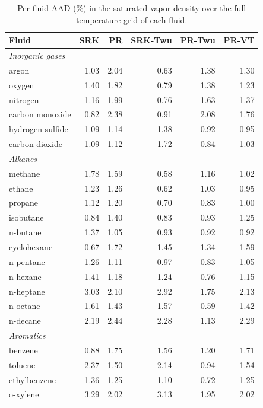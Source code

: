 \begin{table}[H]
\centering
\caption{Per-fluid AAD (\%) in the saturated-vapor density over the full temperature grid of each fluid.}
\label{tab:perfluidrv}
\footnotesize
\begin{tabular}{lrrrrr}
\toprule
Fluid & SRK & PR & SRK-Twu & PR-Twu & PR-VT \\
\midrule
\multicolumn{6}{l}{\itshape Inorganic gases}\\
\quad argon & 1.03 & 2.04 & 0.63 & 1.38 & 1.30 \\
\quad oxygen & 1.40 & 1.82 & 0.79 & 1.38 & 1.23 \\
\quad nitrogen & 1.16 & 1.99 & 0.76 & 1.63 & 1.37 \\
\quad carbon monoxide & 0.82 & 2.38 & 0.91 & 2.08 & 1.76 \\
\quad hydrogen sulfide & 1.09 & 1.14 & 1.38 & 0.92 & 0.95 \\
\quad carbon dioxide & 1.09 & 1.12 & 1.72 & 0.84 & 1.03 \\
\multicolumn{6}{l}{\itshape Alkanes}\\
\quad methane & 1.78 & 1.59 & 0.58 & 1.16 & 1.02 \\
\quad ethane & 1.23 & 1.26 & 0.62 & 1.03 & 0.95 \\
\quad propane & 1.12 & 1.20 & 0.70 & 0.83 & 1.00 \\
\quad isobutane & 0.84 & 1.40 & 0.83 & 0.93 & 1.25 \\
\quad n-butane & 1.37 & 1.05 & 0.93 & 0.92 & 0.92 \\
\quad cyclohexane & 0.67 & 1.72 & 1.45 & 1.34 & 1.59 \\
\quad n-pentane & 1.26 & 1.11 & 0.97 & 0.83 & 1.05 \\
\quad n-hexane & 1.41 & 1.18 & 1.24 & 0.76 & 1.15 \\
\quad n-heptane & 3.03 & 2.10 & 2.92 & 1.75 & 2.13 \\
\quad n-octane & 1.61 & 1.43 & 1.57 & 0.59 & 1.42 \\
\quad n-decane & 2.19 & 2.44 & 2.28 & 1.13 & 2.29 \\
\multicolumn{6}{l}{\itshape Aromatics}\\
\quad benzene & 0.88 & 1.75 & 1.56 & 1.20 & 1.71 \\
\quad toluene & 2.37 & 1.50 & 2.14 & 0.94 & 1.54 \\
\quad ethylbenzene & 1.36 & 1.25 & 1.10 & 0.72 & 1.25 \\
\quad o-xylene & 3.29 & 2.02 & 3.13 & 1.95 & 2.02 \\

\end{tabular}
\end{table}
